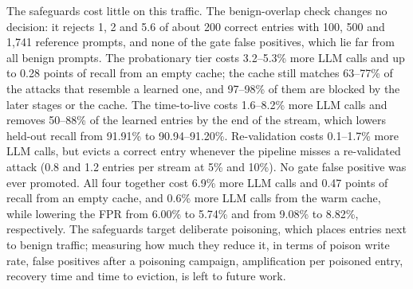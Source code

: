 \documentclass[runningheads]{llncs}
\newif\ifrev
\newcommand{\rev}[1]{\ifrev\hl{#1}\else#1\fi}                  %
\begin{document}
\rev{The safeguards cost little on this traffic. The benign-overlap check changes no decision: it rejects 1, 2 and 5.6 of about 200 correct entries with 100, 500 and 1{,}741 reference prompts, and none of the gate false positives, which lie far from all benign prompts. The probationary tier costs 3.2--5.3\% more LLM calls and up to 0.28 points of recall from an empty cache; the cache still matches 63--77\% of the attacks that resemble a learned one, and 97--98\% of them are blocked by the later stages or the cache. The time-to-live costs 1.6--8.2\% more LLM calls and removes 50--88\% of the learned entries by the end of the stream, which lowers held-out recall from 91.91\% to 90.94--91.20\%. Re-validation costs 0.1--1.7\% more LLM calls, but evicts a correct entry whenever the pipeline misses a re-validated attack (0.8 and 1.2 entries per stream at 5\% and 10\%). No gate false positive was ever promoted. All four together cost 6.9\% more LLM calls and 0.47 points of recall from an empty cache, and 0.6\% more LLM calls from the warm cache, while lowering the FPR from 6.00\% to 5.74\% and from 9.08\% to 8.82\%, respectively.} \rev{The safeguards target deliberate poisoning, which places entries next to benign traffic; measuring how much they reduce it, in terms of poison write rate, false positives after a poisoning campaign, amplification per poisoned entry, recovery time and time to eviction, is left to future work.}
\end{document}
